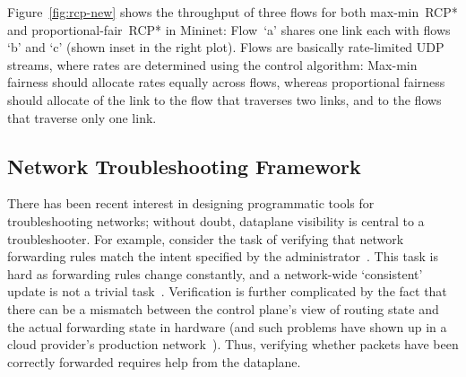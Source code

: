 Figure~\ref{fig:rcp-new} shows the throughput of three flows for both
max-min~RCP* and proportional-fair~RCP* in Mininet: Flow~`a' shares
one link each with flows `b' and `c' (shown inset in the right plot).
Flows are basically rate-limited UDP streams, where rates are
determined using the control algorithm: Max-min fairness should
allocate rates equally across flows, whereas proportional fairness
should allocate
 of the link to the flow that traverses two links, and
 to the flows that traverse only one link.


\subsection{Network Troubleshooting Framework}\label{subsec:netsight}
There has been recent interest in designing programmatic tools for
troubleshooting networks; without doubt, dataplane visibility is
central to a troubleshooter.  For example, consider the task of
verifying that network forwarding rules match the intent specified by
the administrator~\cite{kazemian2013real,khurshid2012veriflow}.  This
task is hard as forwarding rules change constantly, and a
network-wide `consistent' update is not a trivial
task~\cite{reitblatt2012abstractions}.  Verification is further complicated by
the fact that there can be a mismatch between the control plane's view
of routing state and the actual forwarding state in hardware (and such
problems have shown up in a cloud provider's production
network~\cite{chakim-personal}).  Thus, verifying whether packets have
been correctly forwarded requires help from the dataplane.

